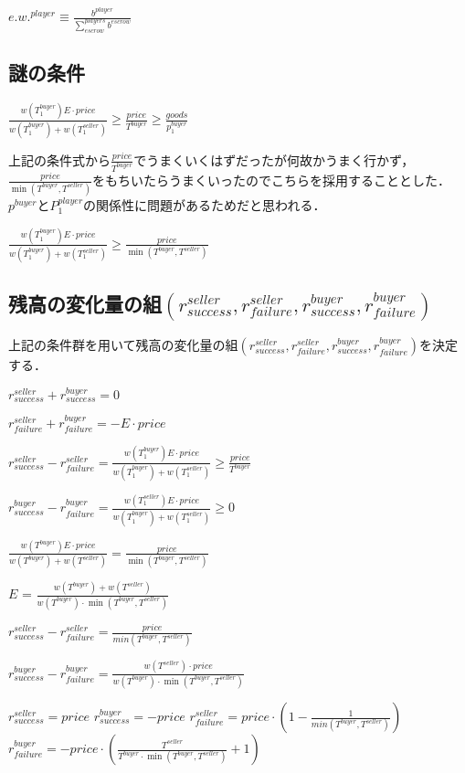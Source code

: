 $ e.w.^{player} \equiv \frac{b^{player}}{\sum^{players}_{escrow}b^{escrow}} $

\subsection{謎の条件}
$ \frac{w(T^{buyer}_1)E \cdot price}{w(T^{buyer}_1) + w(T^{seller}_1)} \geq \frac{price}{T^{buyer}} \geq \frac{goods}{p^{buyer}_1} $

上記の条件式から$ \frac{price}{ T^{buyer} } $でうまくいくはずだったが何故かうまく行かず，$ \frac{price}{ \min(T^{buyer}, T^{seller})} $をもちいたらうまくいったのでこちらを採用することとした．$ p^{buyer} $と$ P^{player}_1 $の関係性に問題があるためだと思われる．

$ \frac{w(T^{buyer}_1)E \cdot price}{w(T^{buyer}_1) + w(T^{seller}_1)} \geq \frac{price}{ \min(T^{buyer}, T^{seller})} $


\subsection{残高の変化量の組$ (r^{seller}_{success}, r^{seller}_{failure}, r^{buyer}_{success}, r^{buyer}_{failure}) $}
上記の条件群を用いて残高の変化量の組$ (r^{seller}_{success}, r^{seller}_{failure}, r^{buyer}_{success}, r^{buyer}_{failure}) $を決定する．


$ r^{seller}_{success}+r^{buyer}_{success} = 0 $

$ r^{seller}_{failure}+r^{buyer}_{failure} = -E \cdot price $

$ r^{seller}_{success} - r^{seller}_{failure} = \frac{w(T^{buyer}_1)E \cdot price}{w(T^{buyer}_1) + w(T^{seller}_1)} \geq \frac{price}{T^{buyer}} $

$ r^{buyer}_{success} - r^{buyer}_{failure} = \frac{w(T^{seller}_1)E \cdot price}{w(T^{buyer}_1) + w(T^{seller}_1)} \geq 0 $

$ \frac{w(T^{buyer})E \cdot price}{w(T^{buyer}) + w(T^{seller})} = \frac{price}{\min(T^{buyer}, T^{seller})} $

$ E $ = $ \frac{w(T^{buyer})+w(T^{seller})}{w(T^{buyer}) \cdot \min(T^{buyer}, T^{seller})} $

$ r^{seller}_{success}-r^{seller}_{failure} = \frac{price}{min(T^{buyer}, T^{seller})} $

$ r^{buyer}_{success} - r^{buyer}_{failure} = \frac{w(T^{seller}) \cdot price}{w(T^{buyer}) \cdot \min(T^{buyer}, T^{seller})} $


$ r^{seller}_{success} = price $
$ r^{buyer}_{success} = -price $
$ r^{seller}_{failure} = price \cdot (1 - \frac{1}{min(T^{buyer}, T^{seller})}) $
$ r^{buyer}_{failure} = - price \cdot (\frac{T^{seller}}{T^{buyer} \cdot \min(T^{buyer}, T^{seller})} + 1) $
